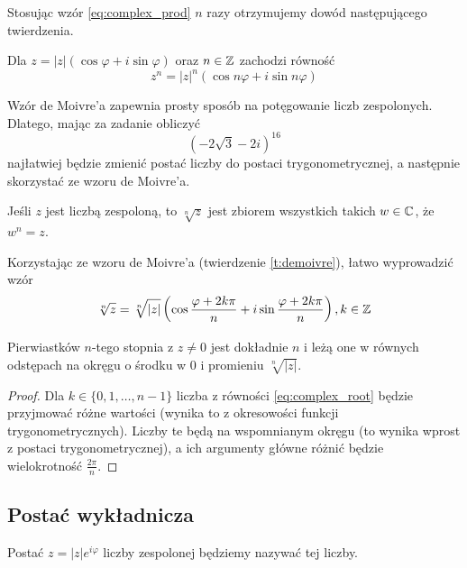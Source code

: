 Stosując wzór \ref{eq:complex_prod} $n$ razy otrzymujemy dowód następującego twierdzenia.

\begin{theorem}
    \label{t:demoivre}
    Dla $z = |z|(\cos\varphi + i\sin\varphi)$ oraz $n \in \mathbb Z$ zachodzi równość
    \[ z^n = |z|^n(\cos n\varphi + i\sin n\varphi) \]
\end{theorem}

Wzór de Moivre'a zapewnia prosty sposób na potęgowanie liczb zespolonych. Dlatego, mając za zadanie obliczyć
\[ (-2\sqrt{3} - 2i)^{16} \]
najłatwiej będzie zmienić postać liczby do postaci trygonometrycznej, a następnie skorzystać ze wzoru de Moivre'a.

\begin{definition}
    Jeśli $z$ jest liczbą zespoloną, to $\sqrt[n]{z}$ jest zbiorem wszystkich takich $w \in \mathbb C$, że $w^n = z$.
\end{definition}

Korzystając ze wzoru de Moivre'a (twierdzenie \ref{t:demoivre}), łatwo wyprowadzić wzór
\begin{equation}
    \label{eq:complex_root}
    \sqrt[n]{z} = \sqrt[n]{|z|}\left(\cos\frac{\varphi + 2k\pi}{n} + i\sin\frac{\varphi + 2k\pi}{n}\right), k \in \mathbb Z
\end{equation}

\begin{fact}
    Pierwiastków $n$-tego stopnia z $z \neq 0$ jest dokładnie $n$ i leżą one w równych odstępach na okręgu o środku w $0$ i promieniu $\sqrt[n]{|z|}$.
\end{fact}
\begin{proof}
    Dla $k \in \{0, 1, \ldots, n-1\}$ liczba z równości \ref{eq:complex_root} będzie przyjmować różne wartości (wynika to z okresowości funkcji trygonometrycznych). Liczby te będą na wspomnianym okręgu (to wynika wprost z postaci trygonometrycznej), a ich argumenty główne różnić będzie wielokrotność $\frac{2\pi}{n}$.
\end{proof}

\subsection{Postać wykładnicza}
Postać $z = |z|e^{i\varphi}$ liczby zespolonej będziemy nazywać  tej liczby.


